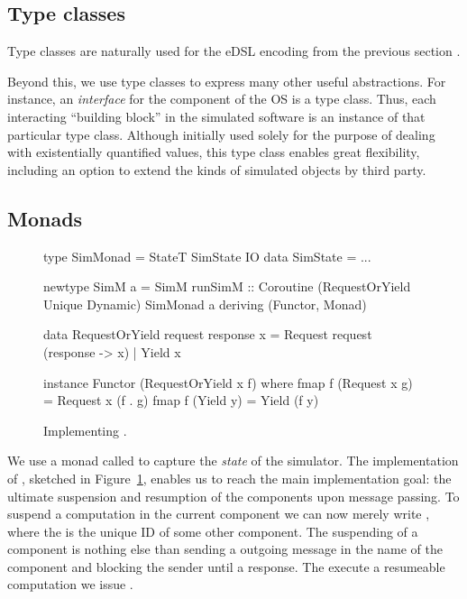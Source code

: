 \subsection{Type classes}
Type classes are naturally used for the eDSL encoding from the previous section \cite{Hall:1996:TCH:227699.227700,final_tagless_embedding}.

Beyond this, we use type classes to express many other useful abstractions.
For instance, an \emph{interface} for the component of the OS is a type class.
Thus, each interacting ``building block'' in the simulated software is an instance of that particular type class.
Although initially used solely for the purpose of dealing with existentially quantified values, this  type class enables great flexibility, including an option to extend the kinds of simulated objects by third party.

\subsection{Monads}
\label{sec:impl-monads}
\begin{figure}
\centering
\begin{code*}
type SimMonad =  StateT SimState IO
data SimState = ...

newtype SimM a
  = SimM { runSimM :: Coroutine
      (RequestOrYield Unique Dynamic)
      SimMonad a }
    deriving (Functor, Monad)

data RequestOrYield request response x
  = Request request (response -> x)
  | Yield   x

instance Functor (RequestOrYield x f) where
  fmap f (Request x g) = Request x (f . g)
  fmap f (Yield y)     = Yield (f y)
\end{code*}
\caption{Implementing .}
\label{fig:code-simm}
\end{figure}

We use a monad called  to capture the \emph{state} of the simulator.
The implementation of , sketched in Figure~\ref{fig:code-simm}, enables us to reach the main implementation goal: the ultimate suspension and resumption of the components upon message passing.
To suspend a computation in the current component we can now merely write , where the  is the unique ID of some other component.
The suspending of a component is nothing else than sending a outgoing message in the name of the component and blocking the sender until a response.
The execute a resumeable computation we issue  \mbox{.} %



